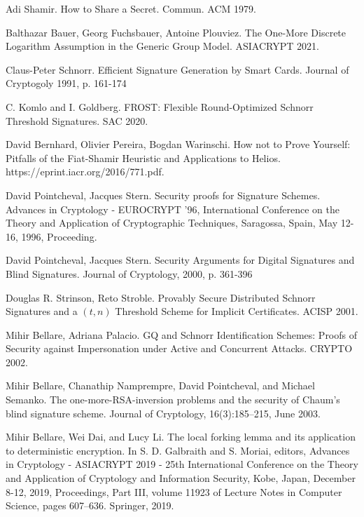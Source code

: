\documentclass[psamsfonts, reqno]{amsart}
\theoremstyle{definition}
\theoremstyle{remark}
\numberwithin{equation}{section}
\begin{document}
\begin{thebibliography}{9}

Adi Shamir.
How to Share a Secret.
Commun. ACM 1979.

Balthazar Bauer, Georg Fuchsbauer, Antoine Plouviez.
The One-More Discrete Logarithm Assumption
in the Generic Group Model.
ASIACRYPT 2021.

Claus-Peter Schnorr.
Efficient Signature Generation by Smart Cards.
Journal of Cryptogoly 1991, p. 161-174

C. Komlo and I. Goldberg.
FROST: Flexible Round-Optimized Schnorr Threshold Signatures.
SAC 2020.

David Bernhard, Olivier Pereira, Bogdan Warinschi.
How not to Prove Yourself: Pitfalls of the Fiat-Shamir Heuristic
and Applications to Helios.
https://eprint.iacr.org/2016/771.pdf.

David Pointcheval, Jacques Stern.
Security proofs for Signature Schemes.
Advances in Cryptology - EUROCRYPT '96, International Conference
on the Theory and Application of Cryptographic Techniques,
Saragossa, Spain, May 12-16, 1996, Proceeding.

David Pointcheval, Jacques Stern.
Security Arguments for Digital Signatures and Blind Signatures.
Journal of Cryptology, 2000, p. 361-396

Douglas R. Strinson, Reto Stroble.
Provably Secure Distributed Schnorr
Signatures and a $(t, n)$ Threshold Scheme for Implicit Certificates.
ACISP 2001.

Mihir Bellare, Adriana Palacio.
GQ and Schnorr Identification Schemes: Proofs
of Security against Impersonation under
Active and Concurrent Attacks.
CRYPTO 2002.

Mihir Bellare, Chanathip Namprempre, David Pointcheval,
and Michael Semanko. The one-more-RSA-inversion problems
and the security of Chaum’s blind signature scheme.
Journal of Cryptology, 16(3):185–215, June 2003.

Mihir Bellare, Wei Dai, and Lucy Li. The local forking lemma and its
application to deterministic encryption.
In S. D. Galbraith and S. Moriai, editors,
Advances in Cryptology - ASIACRYPT 2019 - 25th International Conference
on the Theory and Application of Cryptology and Information Security,
Kobe, Japan, December 8-12, 2019, Proceedings, Part III, volume 11923 of
Lecture Notes in Computer Science, pages 607–636. Springer, 2019.


\end{thebibliography}
\end{document}
